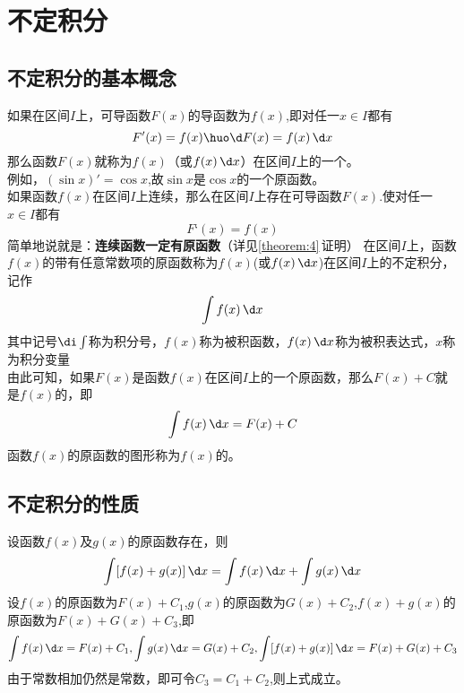 \chapter{不定积分}
\section{不定积分的基本概念}
如果在区间$I$上，可导函数$F(x)$的导函数为$f(x)$,即对任一$x\in I$都有
\begin{equation}
	F'(x)=f(x)\huo \d F(x)=f(x)\,\d x
\end{equation}
那么函数$F(x)$就称为$f(x)$（或$f(x)\,\d x$）在区间$I$上的一个。\\
\kg 例如，$(\sin x)'=\cos x$,故$\sin x$是$\cos x$的一个原函数。
\\ 

\sj
\theorem[原函数存在定理]
如果函数$f(x)$在区间$I$上连续，那么在区间$I$上存在可导函数$F(x)$.使对任一$x\in I$都有
\begin{equation}
	F‘(x)=f(x)
\end{equation}
简单地说就是：\textbf{连续函数一定有原函数}（详见\ref{theorem:4}$\,$证明）
\warn[\kg 由于常数$C$的导数$(C)‘=0$,故一个函数的原函数有多个，可表示为$F(x)+C$($C$为常数)。]
在区间$I$上，函数$f(x)$的带有任意常数项的原函数称为$f(x)$(或$f(x)\,\d x$)在区间$I$上的不定积分，记作
\begin{equation}
	\int f(x)\,\d x
\end{equation}
其中记号$\di\int$称为积分号，$f(x)$称为被积函数，$f(x)\,\d x$称为被积表达式，$x$称为积分变量
\\ 由此可知，如果$F(x)$是函数$f(x)$在区间$I$上的一个原函数，那么$F(x)+C$就是$f(x)$的，即
\begin{equation}
	\int f(x)\,\d x=F(x)+C
\end{equation}
\kg 函数$f(x)$的原函数的图形称为$f(x)$的。
\section{不定积分的性质}
\theorem[不定积分性质1]
设函数$f(x)$及$g(x)$的原函数存在，则
\begin{equation}
	\int [f(x)+g(x)]\,\d x=\int f(x)\,\d x+\int g(x)\,\d x
\end{equation}
\proof 设$f(x)$的原函数为$F(x)+C_1$,$g(x)$的原函数为$G(x)+C_2$,$f(x)+g(x)$的原函数为$F(x)+G(x)+C_3$,即
\sj
\begin{equation}
	\nonumber
	\int f(x)\,\d x=F(x)+C_1,\int g(x)\,\d x=G(x)+C_2,\int[f(x)+g(x)]\,\d x=F(x)+G(x)
+C_3\end{equation}
由于常数相加仍然是常数，即可令$C_3=C_1+C_2$,则上式成立。


